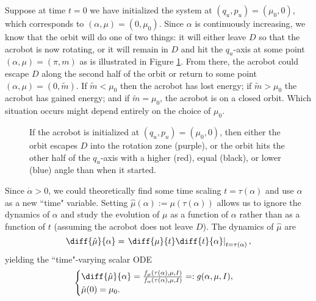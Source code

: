 Suppose at time \(t = 0\) we have initialized the system at 
\((q_u,p_u) = (\mu_0,0)\), which corresponds to \((\alpha,\mu) = (0,\mu_0)\).
Since \(\alpha\) is continuously increasing, we know that the orbit will do one
of two things: it will either leave \(D\) so that the acrobot is now rotating,
or it will remain in \(D\) and hit the \(q_u\)-axis at some point 
\((\alpha,\mu) = (\pi,m)\) as is illustrated in Figure
\ref{fig:acrobot-possible-orbits}.
From there, the acrobot could escape \(D\) along the second half of the orbit or
return to some point \((\alpha,\mu) = (0,\tilde{m})\).
If \(\tilde{m} < \mu_0\) then the acrobot has lost energy; 
if \(\tilde{m} > \mu_0\) the acrobot has gained energy; 
and if \(\tilde{m} = \mu_0\), the acrobot is on a closed orbit.
Which situation occurs might depend entirely on the choice of
\(\mu_0\).

\begin{figure}
    \centering 
    \caption{If the acrobot is initialized at \((q_u,p_u) = (\mu_0,0)\), then
        either the orbit escapes \(D\) into the rotation
        zone (purple), or the orbit hits the other half of the \(q_u\)-axis 
        with a higher (red), equal (black), or lower (blue) angle than when it
        started.}
    \label{fig:acrobot-possible-orbits}
\end{figure}

Since \(\dot{\alpha} > 0\), we could theoretically find some time scaling 
\(t = \tau(\alpha)\) and use \(\alpha\) as a new ``time" variable.
Setting \(\hat{\mu}(\alpha) := \mu(\tau(\alpha))\) allows us to ignore the
dynamics of \(\alpha\) and study the evolution of \(\mu\) as a 
function of \(\alpha\) rather than as a function of \(t\) (assuming the acrobot
does not leave \(D\)).
The dynamics of \(\hat{\mu}\) are
\[
    \diff{\hat{\mu}}{\alpha} = 
    \left.\diff{\mu}{t} \diff{t}{\alpha} \right|_{t =\tau(\alpha)}
    ,
\] 
yielding the ``time"-varying scalar ODE
\begin{equation}\label{eqn:muhat-dot}
    \begin{cases}
        \diff{\hat{\mu}}{\alpha} 
        = \frac{f_\mu(\tau(\alpha),\mu,I)}{f_\alpha(\tau(\alpha),\mu,I)}
        =: g(\alpha,\mu,I)
        , \\
        \hat{\mu}(0) = \mu_0
        .
    \end{cases}
\end{equation}

